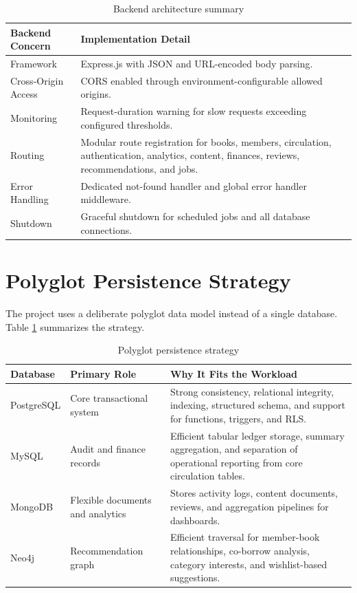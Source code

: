 \documentclass[12pt,a4paper]{report}
\begin{document}
\begin{table}[h!]
\centering
\begin{tabularx}{\textwidth}{p{} X}
\toprule
\textbf{Backend Concern} & \textbf{Implementation Detail} \\
\midrule
Framework & Express.js with JSON and URL-encoded body parsing. \\
Cross-Origin Access & CORS enabled through environment-configurable allowed origins. \\
Monitoring & Request-duration warning for slow requests exceeding configured thresholds. \\
Routing & Modular route registration for books, members, circulation, authentication, analytics, content, finances, reviews, recommendations, and jobs. \\
Error Handling & Dedicated not-found handler and global error handler middleware. \\
Shutdown & Graceful shutdown for scheduled jobs and all database connections. \\
\bottomrule
\end{tabularx}
\caption{Backend architecture summary}
\end{table}

\section{Polyglot Persistence Strategy}
The project uses a deliberate polyglot data model instead of a single database. Table \ref{tab:polyglot} summarizes the strategy.

\begin{table}[h!]
\centering
\begin{tabularx}{\textwidth}{p{} p{} X}
\toprule
\textbf{Database} & \textbf{Primary Role} & \textbf{Why It Fits the Workload} \\
\midrule
PostgreSQL & Core transactional system & Strong consistency, relational integrity, indexing, structured schema, and support for functions, triggers, and RLS. \\
MySQL & Audit and finance records & Efficient tabular ledger storage, summary aggregation, and separation of operational reporting from core circulation tables. \\
MongoDB & Flexible documents and analytics & Stores activity logs, content documents, reviews, and aggregation pipelines for dashboards. \\
Neo4j & Recommendation graph & Efficient traversal for member-book relationships, co-borrow analysis, category interests, and wishlist-based suggestions. \\
\bottomrule
\end{tabularx}
\caption{Polyglot persistence strategy}
\label{tab:polyglot}
\end{table}
\end{document}
